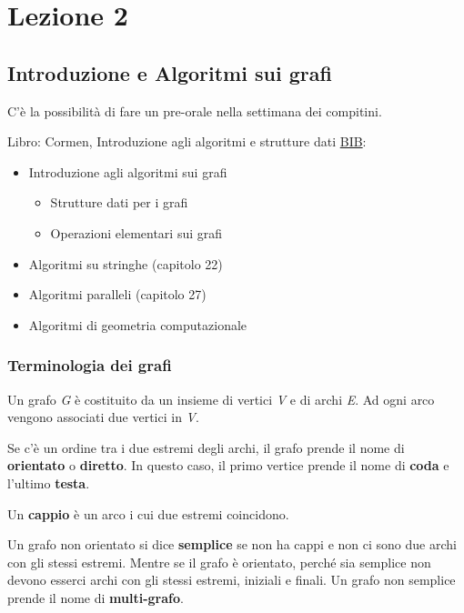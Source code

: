\chapter{Lezione 2}
\section{Introduzione e Algoritmi sui grafi}\label{lezione-2---introduzione-e-algoritmi-sui-grafi}

C'è la possibilità di fare un pre-orale nella settimana dei compitini.

Libro: Cormen, Introduzione agli algoritmi e strutture dati
\href{http://catalogo.unipd.it/F/FCKK1DACESL2TDH5CF15FLDL2BUM936U1XG9U15MFDCKI764BV-10675?func=full-set-set\&set_number=011139\&set_entry=000001\&format=999}{BIB}:

\begin{itemize}
\item
  Introduzione agli algoritmi sui grafi
  \begin{itemize}
  \item
    Strutture dati per i grafi
  \item
    Operazioni elementari sui grafi
  \end{itemize}
\item
  Algoritmi su stringhe (capitolo 22)
\item
  Algoritmi paralleli (capitolo 27)
\item
  Algoritmi di geometria computazionale
\end{itemize}

\subsection{Terminologia dei grafi}\label{terminologia-dei-grafi}

Un grafo \emph{G} è costituito da un insieme di vertici \emph{V} e di
archi \emph{E}. Ad ogni arco vengono associati due vertici in \emph{V}.

Se c'è un ordine tra i due estremi degli archi, il grafo prende il nome
di \textbf{orientato} o \textbf{diretto}. In questo caso, il primo
vertice prende il nome di \textbf{coda} e l'ultimo \textbf{testa}.

Un \textbf{cappio} è un arco i cui due estremi coincidono.

Un grafo non orientato si dice \textbf{semplice} se non ha cappi e non
ci sono due archi con gli stessi estremi. Mentre se il grafo è
orientato, perché sia semplice non devono esserci archi con gli stessi
estremi, iniziali e finali. Un grafo non semplice prende il nome di
\textbf{multi-grafo}.

